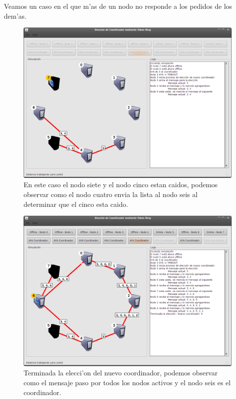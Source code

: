 Veamos un caso en el que m'as de un nodo no responde a los pedidos de los dem'as.

\begin{figure}
\centering
 \includegraphics[scale=0.4,keepaspectratio=true]{./imagenes/tokenRing/token7.png}
 \caption{En este caso el nodo siete y el nodo cinco estan caidos, podemos observar como el nodo cuatro envia la lista al nodo seis al determinar que el cinco esta caido.}
\end{figure}

\begin{figure}
\centering
 \includegraphics[scale=0.4,keepaspectratio=true]{./imagenes/tokenRing/token8.png}
 \caption{Terminada la elecci'on del nuevo coordinador, podemos observar como el mensaje paso por todos los nodos activos y el nodo seis es el coordinador.}
\end{figure}